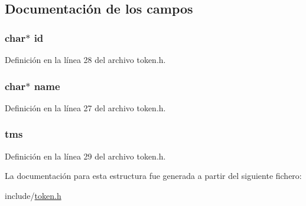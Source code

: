 \subsection{Documentación de los campos}
\hypertarget{struct_s_t___t_o_k_e_n_aecb3b0d045ada529257a2fbf8f829599}{}
\subsubsection[{id}]{\setlength{\rightskip}{0pt plus 5cm}char$\ast$ id}\label{struct_s_t___t_o_k_e_n_aecb3b0d045ada529257a2fbf8f829599}


Definición en la línea 28 del archivo token.\+h.

\hypertarget{struct_s_t___t_o_k_e_n_a5ac083a645d964373f022d03df4849c8}{}
\subsubsection[{name}]{\setlength{\rightskip}{0pt plus 5cm}char$\ast$ name}\label{struct_s_t___t_o_k_e_n_a5ac083a645d964373f022d03df4849c8}


Definición en la línea 27 del archivo token.\+h.

\hypertarget{struct_s_t___t_o_k_e_n_a7427db66ac10c39267f1981f54f0a91f}{}
\subsubsection[{tms}]{ tms}\label{struct_s_t___t_o_k_e_n_a7427db66ac10c39267f1981f54f0a91f}


Definición en la línea 29 del archivo token.\+h.



La documentación para esta estructura fue generada a partir del siguiente fichero\+:\begin{DoxyCompactItemize}
\item 
include/\hyperlink{token_8h}{token.\+h}\end{DoxyCompactItemize}
